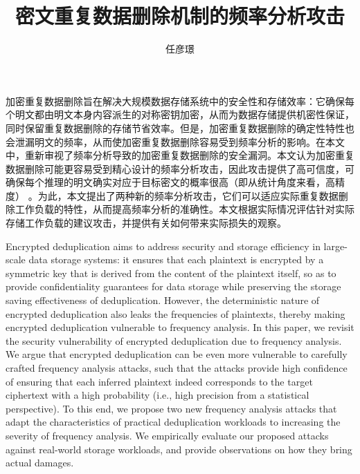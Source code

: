 \documentclass[bachelor]{thesis-uestc}
\title{密文重复数据删除机制的频率分析攻击}
\author{任彦璟}
\begin{document}
\makecover

\begin{chineseabstract}

加密重复数据删除旨在解决大规模数据存储系统中的安全性和存储效率：它确保每个明文都由明文本身内容派生的对称密钥加密，从而为数据存储提供机密性保证，同时保留重复数据删除的存储节省效率。但是，加密重复数据删除的确定性特性也会泄漏明文的频率，从而使加密重复数据删除容易受到频率分析的影响。在本文中，重新审视了频率分析导致的加密重复数据删除的安全漏洞。本文认为加密重复数据删除可能更容易受到精心设计的频率分析攻击，因此攻击提供了高可信度，可确保每个推理的明文确实对应于目标密文的概率很高（即从统计角度来看，高精度） 。为此，本文提出了两种新的频率分析攻击，它们可以适应实际重复数据删除工作负载的特性，从而提高频率分析的准确性。本文根据实际情况评估针对实际存储工作负载的建议攻击，并提供有关如何带来实际损失的观察。

\end{chineseabstract}

\begin{englishabstract}
Encrypted deduplication aims to address security and storage efficiency in large-scale data storage systems: it ensures that each plaintext is encrypted by a symmetric key that is derived from the content of the plaintext itself, so as to provide confidentiality guarantees for data storage while preserving the storage saving effectiveness of deduplication. However, the deterministic nature of encrypted deduplication also leaks the frequencies of plaintexts, thereby making encrypted deduplication vulnerable to frequency analysis. In this paper, we revisit the security vulnerability of encrypted deduplication due to frequency analysis. We argue that encrypted deduplication can be even more vulnerable to carefully crafted frequency analysis attacks, such that the attacks provide high confidence of ensuring that each inferred plaintext indeed corresponds to the target ciphertext with a high probability (i.e., high precision from a statistical perspective). To this end, we propose two new frequency analysis attacks that adapt the characteristics of practical deduplication workloads to increasing the severity of frequency analysis. We empirically evaluate our proposed attacks against real-world storage workloads, and provide observations on how they bring actual damages.

\end{englishabstract}
\end{document}
